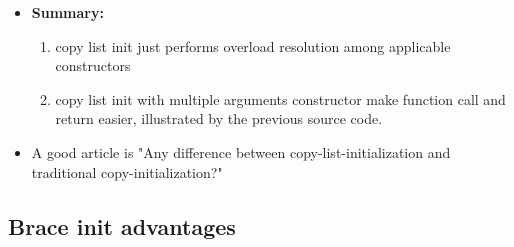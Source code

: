 \documentclass[a4paper,11pt,twoside]{book}
\begin{document}
\begin{itemize}
	
	\item \textbf{Summary:}
	\begin{enumerate}
		\item copy list init just performs overload resolution among applicable constructors
		
		\item copy list init with multiple arguments constructor make function call and return easier, illustrated by the previous source code.
	\end{enumerate}
	
	\item A good article is "Any difference between copy-list-initialization and traditional copy-initialization?"
	
	
\end{itemize}


\subsection{Brace init advantages}
			 
\end{document}
